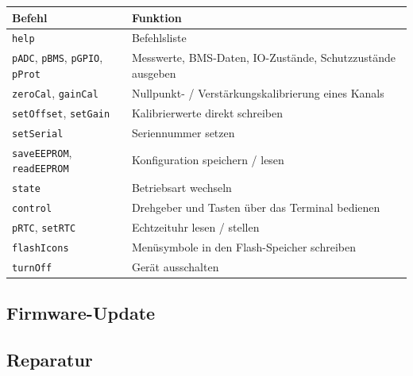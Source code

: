\begin{longtable}{p{4cm}p{11.5cm}}
    \rowcolor{gray} \textbf{Befehl} & \textbf{Funktion} \\ \endhead
    \texttt{help}                 & Befehlsliste \\
    \texttt{pADC}, \texttt{pBMS}, \texttt{pGPIO}, \texttt{pProt} & Messwerte, \ac{BMS}-Daten, IO-Zustände, Schutzzustände ausgeben \\
    \texttt{zeroCal}, \texttt{gainCal} & Nullpunkt- / Verstärkungskalibrierung eines Kanals \\
    \texttt{setOffset}, \texttt{setGain} & Kalibrierwerte direkt schreiben \\
    \texttt{setSerial}            & Seriennummer setzen \\
    \texttt{saveEEPROM}, \texttt{readEEPROM} & Konfiguration speichern / lesen \\
    \texttt{state}                & Betriebsart wechseln \\
    \texttt{control}              & Drehgeber und Tasten über das Terminal bedienen \\
    \texttt{pRTC}, \texttt{setRTC} & Echtzeituhr lesen / stellen \\
    \texttt{flashIcons}           & Menüsymbole in den Flash-Speicher schreiben \\
    \texttt{turnOff}              & Gerät ausschalten \\
\end{longtable}

\subsection{Firmware-Update}
\label{sec:fwupdate}

\subsection{Reparatur}
